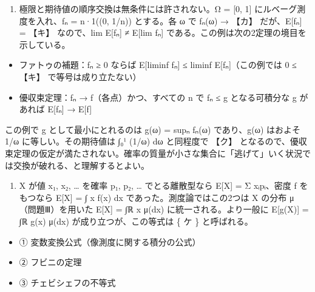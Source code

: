 \documentclass[
  10pt,
  a4paper,
]{article}
\providecommand{\tightlist}{%
  \setlength{\itemsep}{0pt}\setlength{\parskip}{0pt}}
\begin{document}
\begin{enumerate}
\def\labelenumi{(\arabic{enumi})}
\setcounter{enumi}{2}
\tightlist
\item
  極限と期待値の順序交換は無条件には許されない。Ω = {[}0, 1{]}
  にルベーグ測度を入れ、f{\fallbackfont ₙ} = n·1((0, 1/n)) とする。各 ω
  で f{\fallbackfont ₙ}(ω) → 【カ】 だが、E{[}f{\fallbackfont ₙ}{]} =
  【キ】 なので、lim E{[}f{\fallbackfont ₙ}{]} ≠ E{[}lim
  f{\fallbackfont ₙ}{]} である。この例は次の2定理の境目を示している。
\end{enumerate}

\begin{itemize}
\tightlist
\item
  ファトゥの補題：f{\fallbackfont ₙ} ≥ 0 ならば E{[}liminf
  f{\fallbackfont ₙ}{]} ≤ liminf E{[}f{\fallbackfont ₙ}{]}（この例では 0
  ≤ 【キ】 で等号は成り立たない）
\item
  優収束定理：f{\fallbackfont ₙ} → f（各点）かつ、すべての n で
  \textbar f{\fallbackfont ₙ}\textbar{} ≤ g となる可積分な g があれば
  E{[}f{\fallbackfont ₙ}{]} → E{[}f{]}
\end{itemize}

この例で g として最小にとれるのは g(ω) = sup{\fallbackfont ₙ}
f{\fallbackfont ₙ}(ω) であり、g(ω) はおよそ 1/ω に等しい。その期待値は
∫{\fallbackfont ₀}¹ (1/ω) dω と同程度で 【ク】
となるので、優収束定理の仮定が満たされない。確率の質量が小さな集合に「逃げて」いく状況では交換が破れる、と理解するとよい。

\begin{enumerate}
\def\labelenumi{(\arabic{enumi})}
\setcounter{enumi}{3}
\tightlist
\item
  X が値 x{\fallbackfont ₁}, x{\fallbackfont ₂}, \ldots{} を確率
  p{\fallbackfont ₁}, p{\fallbackfont ₂}, \ldots{} でとる離散型なら
  E{[}X{]} = Σ x{\fallbackfont ᵢ}p{\fallbackfont ᵢ}、密度 f をもつなら
  E{[}X{]} = ∫ x f(x) dx であった。測度論ではこの2つは X の分布
  μ（問題Ⅲ）を用いた E{[}X{]} = ∫{\fallbackfont ℝ} x μ(dx)
  に統一される。より一般に E{[}g(X){]} = ∫{\fallbackfont ℝ} g(x) μ(dx)
  が成り立つが、この等式は \{ ケ \} と呼ばれる。
\end{enumerate}

\begin{itemize}
\tightlist
\item
  ① 変数変換公式（像測度に関する積分の公式）
\item
  ② フビニの定理
\item
  ③ チェビシェフの不等式
\end{itemize}
\end{document}
